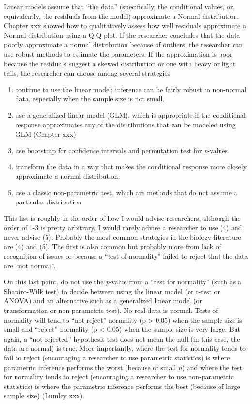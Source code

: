\documentclass[]{book}
\providecommand{\tightlist}{%
  \setlength{\itemsep}{0pt}\setlength{\parskip}{0pt}}
\begin{document}
Linear models assume that ``the data'' (specifically, the conditional
values, or, equivalently, the residuals from the model) approximate a
Normal distribution. Chapter xxx showed how to qualitatively assess how
well residuals approximate a Normal distribution using a Q-Q plot. If
the researcher concludes that the data poorly approximate a normal
distribution because of outliers, the researcher can use robust methods
to estimate the parameters. If the approximation is poor because the
residuals suggest a skewed distribution or one with heavy or light
tails, the researcher can choose among several strategies

\begin{enumerate}
\def\labelenumi{\arabic{enumi}.}
\tightlist
\item
  continue to use the linear model; inference can be fairly robust to
  non-normal data, especially when the sample size is not small.
\item
  use a generalized linear model (GLM), which is appropriate if the
  conditional response approximates any of the distributions that can be
  modeled using GLM (Chapter xxx)
\item
  use bootstrap for confidence intervals and permutation test for
  \emph{p}-values
\item
  transform the data in a way that makes the conditional response more
  closely approximate a normal distribution.
\item
  use a classic non-parametric test, which are methods that do not
  assume a particular distribution
\end{enumerate}

This list is roughly in the order of how I would advise researchers,
although the order of 1-3 is pretty arbitrary. I would rarely advise a
researcher to use (4) and never advise (5). Probably the most common
strategies in the biology literature are (4) and (5). The first is also
common but probably more from lack of recognition of issues or because a
``test of normality'' failed to reject that the data are ``not normal''.

On this last point, do not use the \emph{p}-value from a ``test for
normality'' (such as a Shapiro-Wilk test) to decide between using the
linear model (or t-test or ANOVA) and an alternative such as a
generalized linear model (or transformation or non-parametric test). No
real data is normal. Tests of normality will tend to ``not reject''
normality (p \textgreater{} 0.05) when the sample size is small and
``reject'' normality (p \textless{} 0.05) when the sample size is very
large. But again, a ``not rejected'' hypothesis test does not mean the
null (in this case, the data are normal) is true. More importantly,
where the test for normality tends to fail to reject (encouraging a
researcher to use parametric statistics) is where parametric inference
performs the worst (because of small \emph{n}) and where the test for
normality tends to reject (encouraging a researcher to use
non-parametric statistics) is where the parametric inference performs
the best (because of large sample size) (Lumley xxx).
\end{document}
